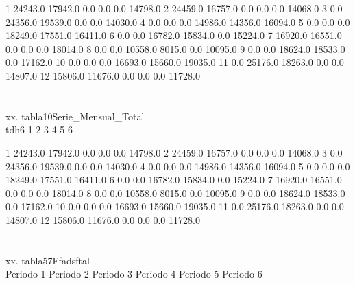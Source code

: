 \documentclass[a4paper,10pt,twocolumn]{article}
\begin{document}
\begin{Form}
1     24243.0  17942.0      0.0      0.0      0.0  14798.0
2     24459.0  16757.0      0.0      0.0      0.0  14068.0
3         0.0  24356.0  19539.0      0.0      0.0  14030.0
4         0.0      0.0      0.0  14986.0  14356.0  16094.0
5         0.0      0.0      0.0  18249.0  17551.0  16411.0
6         0.0      0.0  16782.0  15834.0      0.0  15224.0
7     16920.0  16551.0      0.0      0.0      0.0  18014.0
8         0.0      0.0  10558.0   8015.0      0.0  10095.0
9         0.0      0.0  18624.0  18533.0      0.0  17162.0
10        0.0      0.0      0.0  16693.0  15660.0  19035.0
11        0.0  25176.0  18263.0      0.0      0.0  14807.0
12    15806.0  11676.0      0.0      0.0      0.0  11728.0 \\\\\\xx. tabla10Serie_Mensual_Total \\ tdh6        1        2        3        4        5        6
                                                          
1     24243.0  17942.0      0.0      0.0      0.0  14798.0
2     24459.0  16757.0      0.0      0.0      0.0  14068.0
3         0.0  24356.0  19539.0      0.0      0.0  14030.0
4         0.0      0.0      0.0  14986.0  14356.0  16094.0
5         0.0      0.0      0.0  18249.0  17551.0  16411.0
6         0.0      0.0  16782.0  15834.0      0.0  15224.0
7     16920.0  16551.0      0.0      0.0      0.0  18014.0
8         0.0      0.0  10558.0   8015.0      0.0  10095.0
9         0.0      0.0  18624.0  18533.0      0.0  17162.0
10        0.0      0.0      0.0  16693.0  15660.0  19035.0
11        0.0  25176.0  18263.0      0.0      0.0  14807.0
12    15806.0  11676.0      0.0      0.0      0.0  11728.0 \\\\\\xx. tabla57Ffadsftal \\         Periodo 1  Periodo 2  Periodo 3  Periodo 4  Periodo 5 Periodo 6
                                                                       

\end{Form}
\end{document}
